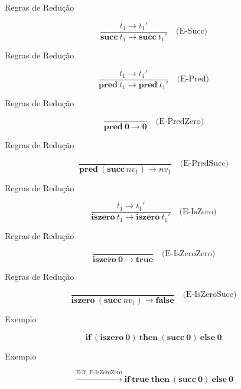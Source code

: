 \begin{frame}{Regras de Redução}

    \[\frac{t_1 \to t_1'}{\mathbf{succ}\ t_1 \to \mathbf{succ}\ t_1'}
    \quad\text{(E-Succ)}\]
\end{frame}

\begin{frame}{Regras de Redução}

    \[
    \frac{t_1 \to t_1'}{\mathbf{pred}\ t_1 \to \mathbf{pred}\ t_1'}
    \quad\text{(E-Pred)}\]
\end{frame}

\begin{frame}{Regras de Redução}

    \[\frac{}{\mathbf{pred}\ \mathbf{0} \to \mathbf{0}}
    \quad\text{(E-PredZero)}
    \]
\end{frame}

\begin{frame}{Regras de Redução}

    \[
    \frac{}{\mathbf{pred}\ (\mathbf{succ}\ nv_1) \to nv_1}
    \quad\text{(E-PredSucc)}\]
\end{frame}

\begin{frame}{Regras de Redução}

    \[\frac{t_1 \to t_1'}{\mathbf{iszero}\ t_1 \to \mathbf{iszero}\ t_1'}
    \quad\text{(E-IsZero)}
    \]
\end{frame}

\begin{frame}{Regras de Redução}

    \[
    \frac{}{\mathbf{iszero}\ \mathbf{0} \to \mathbf{true}}
    \quad\text{(E-IsZeroZero)}\]
\end{frame}

\begin{frame}{Regras de Redução}

    \[\frac{}{\mathbf{iszero}\ (\mathbf{succ}\ nv_1) \to \mathbf{false}}
    \quad\text{(E-IsZeroSucc)}\]
\end{frame}

\begin{frame}{Exemplo}

    \[\mathbf{if}\ (\mathbf{iszero}\ \mathbf{0})\ \mathbf{then}\ (\mathbf{succ}\ \mathbf{0})\ \mathbf{else}\ \mathbf{0}\]
\end{frame}

\begin{frame}{Exemplo}

    \[\xrightarrow{\text{E-If, E-IsZeroZero}}
    \mathbf{if}\ \mathbf{true}\ \mathbf{then}\ (\mathbf{succ}\ \mathbf{0})\ \mathbf{else}\ \mathbf{0}\]
\end{frame}

